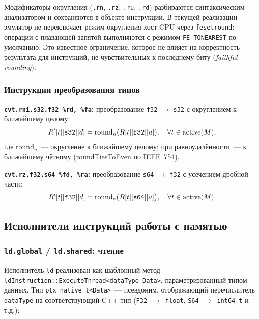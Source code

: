 Модификаторы округления (\texttt{.rn}, \texttt{.rz}, \texttt{.ru},
\texttt{.rd}) разбираются синтаксическим анализатором и сохраняются в объекте инструкции.
В текущей реализации эмулятор не переключает режим округления хост-CPU
через \texttt{fesetround}: операции с плавающей запятой выполняются
с режимом \texttt{FE\_TONEAREST} по умолчанию. Это известное
ограничение, которое не влияет на корректность результата для
инструкций, не чувствительных к последнему биту (\textit{faithful
rounding}).

\subsubsection{Инструкции преобразования типов}

\textbf{\texttt{cvt.rni.s32.f32 \%rd, \%fa}:}
преобразование \texttt{f32} $\to$ \texttt{s32} с округлением к ближайшему целому:
\begin{equation}
  R'[t][\mathtt{s32}][d] = \mathrm{round}_n(R[t][\mathtt{f32}][a]),
  \quad \forall t \in \mathrm{active}(M),
\end{equation}
где $\mathrm{round}_n$~--- округление к ближайшему целому; при равноудалённости~--- к ближайшему чётному (roundTiesToEven по IEEE~754).

\textbf{\texttt{cvt.rz.f32.s64 \%fd, \%ra}:}
преобразование \texttt{s64} $\to$ \texttt{f32} с усечением дробной части:
\begin{equation}
  R'[t][\mathtt{f32}][d] = \mathrm{round}_z\bigl(R[t][\mathtt{s64}][a]\bigr),
  \quad \forall t \in \mathrm{active}(M).
\end{equation}

\subsection{Исполнители инструкций работы с памятью}

\subsubsection{\texttt{ld.global} / \texttt{ld.shared}: чтение}

Исполнитель \texttt{ld} реализован как шаблонный метод \\
\texttt{ldInstruction::ExecuteThread<dataType~Data>}, параметризованный
типом данных. Тип \texttt{ptx\_native\_t<Data>}~--- псевдоним,
отображающий перечислитель \texttt{dataType} на соответствующий
C++-тип (\texttt{F32}~$\to$~\texttt{float}, \texttt{S64}~$\to$~\texttt{int64\_t} и т.д.):

